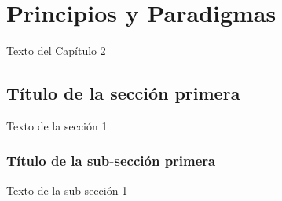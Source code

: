 
\chapter{Principios y Paradigmas}

Texto del Capítulo 2

\section{Título de la sección primera}

Texto de la sección 1


\subsection{Título de la sub-sección primera}

Texto de la sub-sección 1

